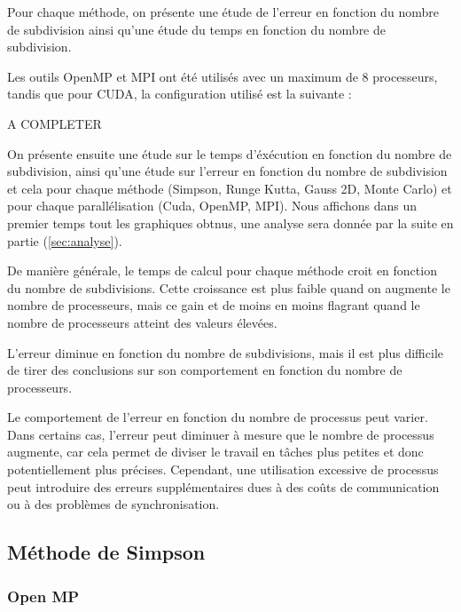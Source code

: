 \documentclass[10pt,a4paper]{article}
\begin{document}
Pour chaque méthode, on présente une étude de l'erreur en fonction du nombre de subdivision ainsi qu'une étude du temps en fonction du nombre de subdivision.

Les outils OpenMP et MPI ont été utilisés avec un maximum de 8 processeurs, tandis que pour CUDA, la configuration utilisé est la suivante : 

A COMPLETER

On présente ensuite une étude sur le temps d'éxécution en fonction du nombre de subdivision, ainsi qu'une étude sur l'erreur en fonction du nombre de subdivision et cela pour chaque méthode (Simpson, Runge Kutta, Gauss 2D, Monte Carlo) et pour chaque parallélisation (Cuda, OpenMP, MPI).
Nous affichons dans un premier temps tout les graphiques obtnus, une analyse sera donnée par la suite en partie (\ref{sec:analyse}).

De manière générale, le temps de calcul pour chaque méthode croit en fonction du nombre de subdivisions. Cette croissance est plus faible quand on augmente le nombre de processeurs, mais ce gain et de moins en moins flagrant quand le nombre de processeurs atteint des valeurs élevées.

L'erreur diminue en fonction du nombre de subdivisions, mais il est plus difficile de tirer des conclusions sur son comportement en fonction du nombre de processeurs. 

Le comportement de l'erreur en fonction du nombre de processus peut varier.
Dans certains cas, l'erreur peut diminuer à mesure que le nombre de processus augmente, car cela permet de diviser le travail en tâches plus petites et donc potentiellement plus précises.
Cependant, une utilisation excessive de processus peut introduire des erreurs supplémentaires dues à des coûts de communication ou à des problèmes de synchronisation.

\subsection{Méthode de Simpson}

\subsubsection{Open MP}
\end{document}
